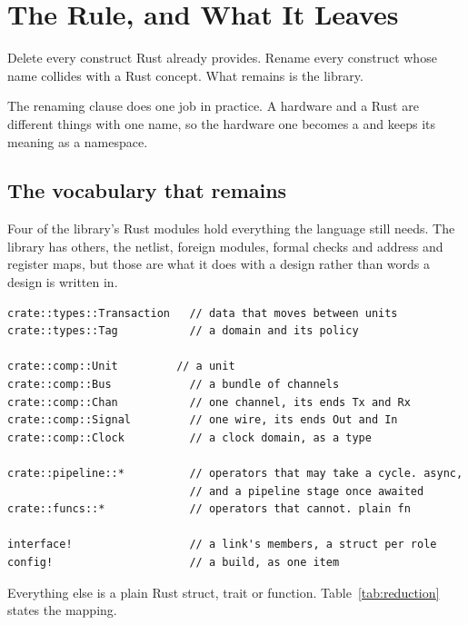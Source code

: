 \section{The Rule, and What It Leaves}
\label{sec:e-rule}

\begin{rulebox}
Delete every construct Rust already provides. Rename every construct whose
name collides with a Rust concept. What remains is the library.
\end{rulebox}

The renaming clause does one job in practice. A hardware  and
a Rust  are different things with one name, so the hardware one
becomes a  and  keeps its meaning as a namespace.

\subsection{The vocabulary that remains}

Four of the library's Rust modules hold everything the language still
needs. The library has others, the netlist, foreign modules, formal
checks and address and register maps, but those are what it does with
a design rather than words a design is written in.

\begin{lstlisting}[caption={The vocabulary that survives the reduction. Four Rust modules and two macros, and everything else is a plain struct, trait or function.},label={lst:vocab}]
crate::types::Transaction   // data that moves between units
crate::types::Tag           // a domain and its policy

crate::comp::Unit         // a unit
crate::comp::Bus            // a bundle of channels
crate::comp::Chan           // one channel, its ends Tx and Rx
crate::comp::Signal         // one wire, its ends Out and In
crate::comp::Clock          // a clock domain, as a type

crate::pipeline::*          // operators that may take a cycle. async,
                            // and a pipeline stage once awaited
crate::funcs::*             // operators that cannot. plain fn

interface!                  // a link's members, a struct per role
config!                     // a build, as one item
\end{lstlisting}

Everything else is a plain Rust struct, trait or function.
Table~\ref{tab:reduction} states the mapping.

